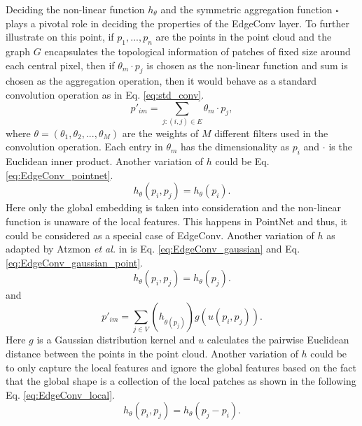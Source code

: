 \vspace{5mm}

Deciding the non-linear function $h_{\theta}$ and the symmetric aggregation function $\square$ plays a pivotal role in deciding the properties of the EdgeConv layer. To further illustrate on this point, if $p_1, ..., p_n$ are the points in the point cloud and the graph $G$ encapsulates the topological information of patches of fixed size around each central pixel, then if $\theta _m \cdot p_j$ is chosen as the non-linear function and sum is chosen as the aggregation operation, then it would behave as a standard convolution operation as in Eq. \ref{eq:std_conv}.
\begin{equation}
    \label{eq:std_conv}
    p'_{im} = \sum_{j:(i,j) \in E}\theta _m \cdot p_j,
\end{equation}
where $\theta = (\theta _1, \theta _2, ... , \theta _M)$ are the weights of $M$ different filters used in the convolution operation. Each entry in $\theta _m$ has the dimensionality as $p_i$ and $\cdot$ is the Euclidean inner product. Another variation of $h$ could be Eq. \ref{eq:EdgeConv_pointnet}. 
\begin{equation}
    \label{eq:EdgeConv_pointnet}
    h_{\theta}(p_i, p_j) = h_{\theta}(p_i).
\end{equation}
Here only the global embedding is taken into consideration and the non-linear function is unaware of the local features. This happens in PointNet and thus, it could be considered as a special case of EdgeConv. Another variation of $h$ as adapted by Atzmon \textit{et al.} in \cite{atzmon2018point} is Eq. \ref{eq:EdgeConv_gaussian} and Eq. \ref{eq:EdgeConv_gaussian_point}.
\begin{equation}
    \label{eq:EdgeConv_gaussian}
    h_{\theta}(p_i, p_j) = h_{\theta}(p_j).
\end{equation}
and 
\begin{equation}
    \label{eq:EdgeConv_gaussian_point}
    p'_{im} = \sum_{j \in V}(h_{\theta (p_j)})g(u(p_i,p_j)).
\end{equation}
Here $g$ is a Gaussian distribution kernel and $u$ calculates the pairwise Euclidean distance between the points in the point cloud. Another variation of $h$ could be to only capture the local features and ignore the global features based on the fact that the global shape is a collection of the local patches as shown in the following Eq. \ref{eq:EdgeConv_local}.
\begin{equation}
    \label{eq:EdgeConv_local}
    h_{\theta}(p_i, p_j) = h_{\theta}(p_j-p_i).
\end{equation}
